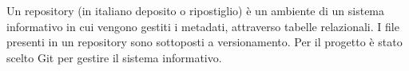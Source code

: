 

{Un repository (in italiano deposito o ripostiglio) è un ambiente di un sistema informativo in cui vengono gestiti i metadati, attraverso tabelle relazionali. I file presenti in un repository sono sottoposti a versionamento. Per il progetto è stato scelto Git per gestire il sistema informativo.}

